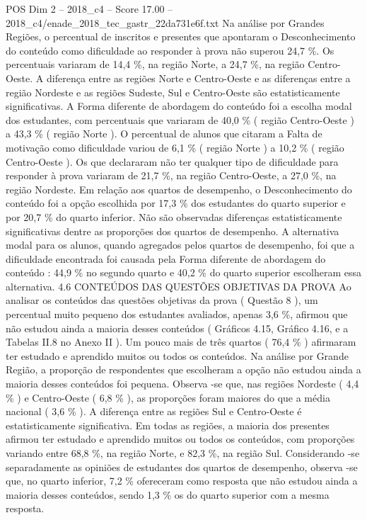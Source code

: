 \begin{textsample}{POS Dim 2 – 2018\_c4 – Score 17.00 – 2018\_c4/enade\_2018\_tec\_gastr\_22da731e6f.txt}
Na análise por Grandes Regiões, o percentual de inscritos e presentes que apontaram o Desconhecimento do conteúdo como dificuldade ao responder à prova não superou 24,7 \%.
Os percentuais variaram de 14,4 \%, na região Norte, a 24,7 \%, na região Centro-Oeste.
A diferença entre as regiões Norte e Centro-Oeste e as diferenças entre a região Nordeste e as regiões Sudeste, Sul e Centro-Oeste são estatisticamente significativas.
A Forma diferente de abordagem do conteúdo foi a escolha modal dos estudantes, com percentuais que variaram de 40,0 \% ( região Centro-Oeste ) a 43,3 \% ( região Norte ).
O percentual de alunos que citaram a Falta de motivação como dificuldade variou de 6,1 \% ( região Norte ) a 10,2 \% ( região Centro-Oeste ).
Os que declararam não ter qualquer tipo de dificuldade para responder à prova variaram de 21,7 \%, na região Centro-Oeste, a 27,0 \%, na região Nordeste.
Em relação aos quartos de desempenho, o Desconhecimento do conteúdo foi a opção escolhida por 17,3 \% dos estudantes do quarto superior e por 20,7 \% do quarto inferior.
Não são observadas diferenças estatisticamente significativas dentre as proporções dos quartos de desempenho.
A alternativa modal para os alunos, quando agregados pelos quartos de desempenho, foi que a dificuldade encontrada foi causada pela Forma diferente de abordagem do conteúdo : 44,9 \% no segundo quarto e 40,2 \% do quarto superior escolheram essa alternativa. 4.6 CONTEÚDOS DAS QUESTÕES OBJETIVAS DA PROVA Ao analisar os conteúdos das questões objetivas da prova ( Questão 8 ), um percentual muito pequeno dos estudantes avaliados, apenas 3,6 \%, afirmou que não estudou ainda a maioria desses conteúdos ( Gráficos 4.15, Gráfico 4.16, e a Tabelas II.8 no Anexo II ).
Um pouco mais de três quartos ( 76,4 \% ) afirmaram ter estudado e aprendido muitos ou todos os conteúdos.
Na análise por Grande Região, a proporção de respondentes que escolheram a opção não estudou ainda a maioria desses conteúdos foi pequena.
Observa -se que, nas regiões Nordeste ( 4,4 \% ) e Centro-Oeste ( 6,8 \% ), as proporções foram maiores do que a média nacional ( 3,6 \% ).
A diferença entre as regiões Sul e Centro-Oeste é estatisticamente significativa.
Em todas as regiões, a maioria dos presentes afirmou ter estudado e aprendido muitos ou todos os conteúdos, com proporções variando entre 68,8 \%, na região Norte, e 82,3 \%, na região Sul.
Considerando -se separadamente as opiniões de estudantes dos quartos de desempenho, observa -se que, no quarto inferior, 7,2 \% ofereceram como resposta que não estudou ainda a maioria desses conteúdos, sendo 1,3 \% os do quarto superior com a mesma resposta.

\end{textsample}
